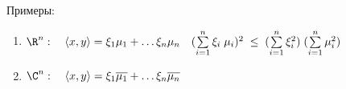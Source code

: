 \documentclass[12px]{report}
\begin{document}
\begin{shex}
    Примеры:
    \begin{enumerate}
        \item $\R^n: \quad \langle x, y \rangle = \xi_1 \mu_1 + \ldots \xi_n \mu_n \quad (\sum\limits_{i = 1}^{n} \xi_i \; \mu_i)^2 \; \leq \; (\sum\limits_{i = 1}^{n} \xi_{i}^2) \; (\sum\limits_{i = 1}^{n} \mu_{i}^2)$
        \item $\C^n: \quad \langle x, y \rangle = \xi_{1} \overline{\mu_{1}} + \ldots \xi_{n} \overline{\mu_{n}}$
    \end{enumerate}
    
\end{shex}
\end{document}
